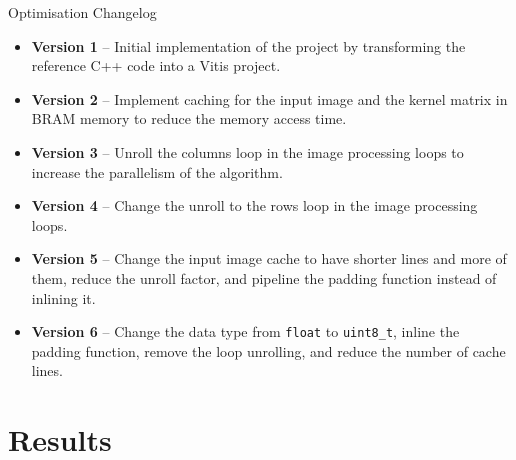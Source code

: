 \documentclass[british, svgnames, dvipsnames]{upb-beamer}
\begin{document}
\begin{frame}{Optimisation Changelog}
    \begin{itemize}
        \setlength\itemsep{0.5cm}
        \pause
        \item \textbf{Version 1} -- Initial implementation of the project by transforming the reference C++ code into a Vitis project.
        \pause
        \item \textbf{Version 2} -- Implement caching for the input image and the kernel matrix in BRAM memory to reduce the memory access time.
        \pause
        \item \textbf{Version 3} -- Unroll the columns loop in the image processing loops to increase the parallelism of the algorithm.
        \pause
        \item \textbf{Version 4} -- Change the unroll to the rows loop in the image processing loops.
        \pause
        \item \textbf{Version 5} -- Change the input image cache to have shorter lines and more of them, reduce the unroll factor, and pipeline the padding function instead of inlining it.
        \pause
        \item \textbf{Version 6} -- Change the data type from \texttt{float} to \texttt{uint8\_t}, inline the padding function, remove the loop unrolling, and reduce the number of cache lines.
    \end{itemize}
\end{frame}

\section{Results}

\newcommand{\size}[1]{\textbf{$\text{#1}\times\text{#1}$}}
\end{document}
